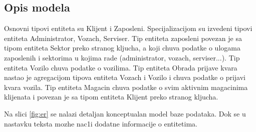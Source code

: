 

\subsection{Opis modela}
Osnovni tipovi entiteta su Klijent i Zaposleni. Specijalizacijom su izvedeni tipovi entiteta Administrator, Vozach, Serviser. Tip entiteta zaposleni povezan je sa tipom entiteta Sektor preko stranog kljucha, a koji chuva podatke o ulogama zaposlenih i sektorima u kojima rade (administrator, vozach, serviser...). Tip entiteta Vozilo chuva podatke o vozilima. Tip entiteta Obrada prijave kvara nastao je agregacijom tipova entiteta Vozach i Vozilo i chuva podatke o prijavi kvara vozila. Tip entiteta Magacin chuva podatke o svim aktivnim magacinima klijenata i povezan je sa tipom entiteta Klijent preko stranog kljucha.



Na slici \ref{fig:er} se nalazi detaljan konceptualan model baze podataka. Dok se u nastavku teksta mozhe nac1i dodatne informacije o entitetima.

